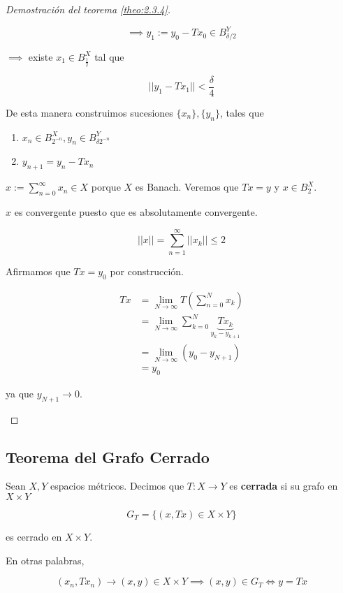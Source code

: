 \begin{proof}[Demostración del teorema \ref{theo:2.3.4}]
\begin{enumerate}
        \[\implies y_1:=y_0-Tx_0\in B_{\delta/2}^Y\]

        $\implies$ existe $x_1\in B_{\frac{1}{2}}^X$ tal que 

        \[||y_1-Tx_1||<\frac{\delta}{4}\]

        De esta manera construimos sucesiones $\{x_n\},\{y_n\}$, tales que

        \begin{enumerate}
            \item $x_n\in B_{2^{-n}}^X, y_n\in B_{\delta 2^{-n}}^Y$
            \item $y_{n+1}=y_n-Tx_n$
        \end{enumerate}

        $x:=\displaystyle\sum_{n=0}^\infty x_n\in X$ porque $X$ es Banach. Veremos que $Tx=y$ y $x\in B_2^X$.

        $x$ es convergente puesto que es absolutamente convergente.

        \[||x||=\sum_{n=1}^\infty ||x_k||\leq 2\]

        Afirmamos que $Tx=y_0$ por construcción.

        \begin{align*}Tx&=\lim_{N\to\infty} T\left(\sum_{n=0}^N x_k\right)\\
        &=\lim_{N\to\infty} \sum_{k=0}^N \underbrace{Tx_k}_{y_k-y_{k+1}}\\
        &=\lim_{N\to\infty} (y_0-y_{N+1})\\\
        &=y_0
    \end{align*}

    ya que $y_{N+1}\to 0$.
    \end{enumerate}
\end{proof}

\subsection{Teorema del Grafo Cerrado}

\begin{fdefinition}
    Sean $X,Y$ espacios métricos. Decimos que $T:X\to Y$ es \textbf{cerrada} si su grafo en $X\times Y$

    \[G_T=\{(x,Tx)\in X\times Y\}\]

    es cerrado en $X\times Y$.
\end{fdefinition}

En otras palabras,

\[(x_n,Tx_n)\to (x,y)\in X\times Y\implies (x,y)\in G_T\iff y=Tx\]

